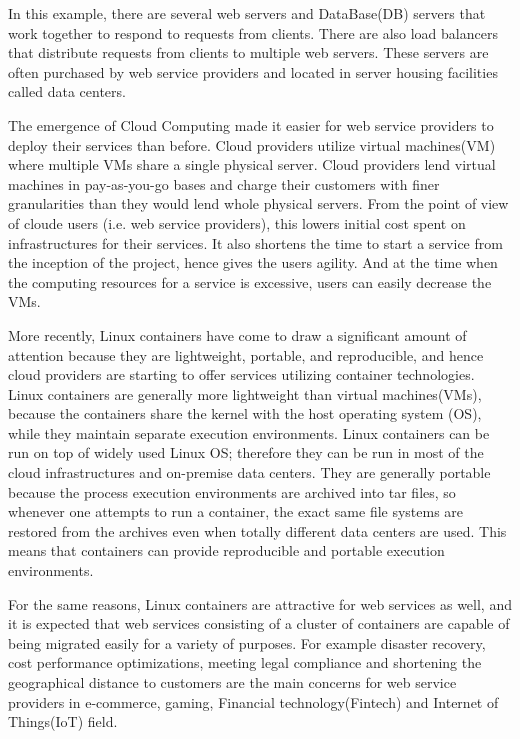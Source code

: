 In this example, there are several web servers and DataBase(DB) servers that work together to respond to requests from clients.
There are also load balancers that distribute requests from clients to multiple web servers.
These servers are often purchased by web service providers and located in server housing facilities called data centers.

The emergence of Cloud Computing made it easier for web service providers to deploy their services than before.
Cloud providers utilize virtual machines(VM) where multiple VMs share a single physical server.
Cloud providers lend virtual machines in pay-as-you-go bases and charge their customers with finer granularities than they would lend whole physical servers.
From the point of view of cloude users (i.e. web service providers), this lowers initial cost spent on infrastructures for their services.
It also shortens the time to start a service from the inception of the project, hence gives the users agility.
And at the time when the computing resources for a service is excessive, users can easily decrease the VMs.

More recently, Linux containers\cite{menage2007adding} have come to draw a significant amount of attention because they are lightweight, portable, and reproducible, and hence cloud providers are starting to offer services utilizing container technologies.
Linux containers are generally more lightweight than virtual machines(VMs), because the containers share the kernel with the host operating system (OS), while they maintain separate execution environments.
Linux containers can be run on top of widely used Linux OS; therefore they can be run in most of the cloud infrastructures and on-premise data centers.
They are generally portable because the process execution environments are archived into tar files,
so whenever one attempts to run a container, the exact same file systems are restored from the archives even when totally different data centers are used.
This means that containers can provide reproducible and portable execution environments.

For the same reasons, Linux containers are attractive for web services as well, and it is expected that web services consisting of a cluster of containers are capable of being migrated easily for a variety of purposes.
For example disaster recovery, cost performance optimizations, meeting legal compliance and shortening the geographical distance to customers are the main concerns for web service providers in e-commerce, gaming, Financial technology(Fintech) and Internet of Things(IoT) field.

